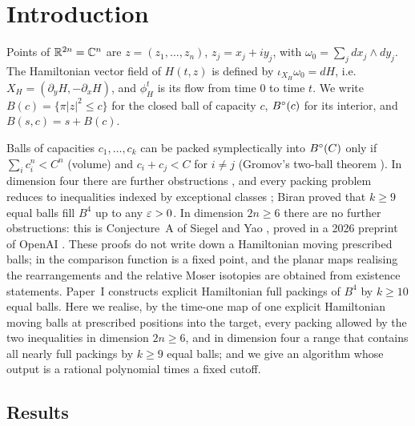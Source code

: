 \section{Introduction}\label{p2:sec-intro}

Points of $\mathbb{R}^{2n}=\mathbb{C}^n$ are $z=(z_1,\dots,z_n)$, $z_j=x_j+iy_j$, with $\omega_0=\sum_jdx_j\wedge dy_j$. The
Hamiltonian vector field of $H(t,z)$ is defined by $\iota_{X_H}\omega_0=dH$, i.e.\
$X_H=(\partial_yH,-\partial_xH)$, and $\phi^t_H$ is its flow from time $0$ to time $t$. We write
$B(c)=\{\pi|z|^2\le c\}$ for the closed ball of capacity $c$, $B^{\circ}(c)$ for its interior, and $B(s,c)=s+B(c)$.

Balls of capacities $c_1,\dots,c_k$ can be packed symplectically into $B^{\circ}(C)$ only if $\sum_ic_i^n<C^n$ (volume) and
$c_i+c_j<C$ for $i\ne j$ (Gromov's two-ball theorem \cite{Gromov1985}). In dimension four there are further
obstructions \cite{McDuffPolterovich1994,Hutchings2011}, and every packing problem reduces to inequalities indexed by
exceptional classes \cite{McDuff1998,LiLiu2001,LiLi2002}; Biran \cite{Biran1997} proved that $k\ge9$ equal balls fill
$B^4$ up to any $\varepsilon>0$. In dimension $2n\ge6$ there are no further obstructions: this is Conjecture~A of Siegel and
Yao \cite{SiegelYao2025}, proved in a 2026 preprint of OpenAI \cite{OpenAI2026}. These proofs do not write down a
Hamiltonian moving prescribed balls; in \cite{OpenAI2026} the comparison function is a fixed point, and the planar maps
realising the rearrangements and the relative Moser isotopies are obtained from existence statements. Paper~I \cite{PaperI} constructs explicit Hamiltonian full packings of $B^4$ by $k\ge10$ equal
balls. Here we realise, by the time-one map of one explicit Hamiltonian moving balls at prescribed positions into the
target, every packing allowed by the two inequalities in dimension $2n\ge6$, and in dimension four a range that
contains all nearly full packings by $k\ge9$ equal balls; and we give an algorithm whose output is a rational
polynomial times a fixed cutoff.

\subsection{Results}\label{p2:sec-intro-results}

